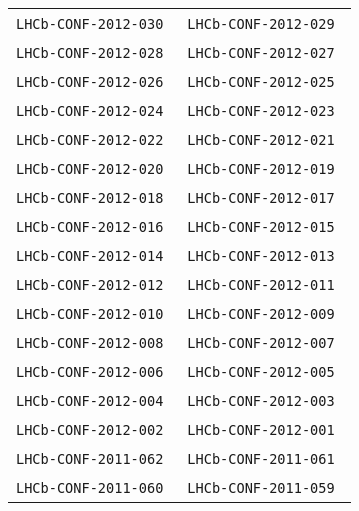 \begin{center}
\begin{longtable}{ll}
\texttt{LHCb-CONF-2012-030}~\cite{LHCb-CONF-2012-030} & 
\texttt{LHCb-CONF-2012-029}~\cite{LHCb-CONF-2012-029} \\
\texttt{LHCb-CONF-2012-028}~\cite{LHCb-CONF-2012-028} & 
\texttt{LHCb-CONF-2012-027}~\cite{LHCb-CONF-2012-027} \\
\texttt{LHCb-CONF-2012-026}~\cite{LHCb-CONF-2012-026} & 
\texttt{LHCb-CONF-2012-025}~\cite{LHCb-CONF-2012-025} \\
\texttt{LHCb-CONF-2012-024}~\cite{LHCb-CONF-2012-024} & 
\texttt{LHCb-CONF-2012-023}~\cite{LHCb-CONF-2012-023} \\
\texttt{LHCb-CONF-2012-022}~\cite{LHCb-CONF-2012-022} & 
\texttt{LHCb-CONF-2012-021}~\cite{LHCb-CONF-2012-021} \\
\texttt{LHCb-CONF-2012-020}~\cite{LHCb-CONF-2012-020} & 
\texttt{LHCb-CONF-2012-019}~\cite{LHCb-CONF-2012-019} \\
\texttt{LHCb-CONF-2012-018}~\cite{LHCb-CONF-2012-018} & 
\texttt{LHCb-CONF-2012-017}~\cite{LHCb-CONF-2012-017} \\
\texttt{LHCb-CONF-2012-016}~\cite{LHCb-CONF-2012-016} & 
\texttt{LHCb-CONF-2012-015}~\cite{LHCb-CONF-2012-015} \\
\texttt{LHCb-CONF-2012-014}~\cite{LHCb-CONF-2012-014} & 
\texttt{LHCb-CONF-2012-013}~\cite{LHCb-CONF-2012-013} \\
\texttt{LHCb-CONF-2012-012}~\cite{LHCb-CONF-2012-012} & 
\texttt{LHCb-CONF-2012-011}~\cite{LHCb-CONF-2012-011} \\
\texttt{LHCb-CONF-2012-010}~\cite{LHCb-CONF-2012-010} & 
\texttt{LHCb-CONF-2012-009}~\cite{LHCb-CONF-2012-009} \\
\texttt{LHCb-CONF-2012-008}~\cite{LHCb-CONF-2012-008} & 
\texttt{LHCb-CONF-2012-007}~\cite{LHCb-CONF-2012-007} \\
\texttt{LHCb-CONF-2012-006}~\cite{LHCb-CONF-2012-006} & 
\texttt{LHCb-CONF-2012-005}~\cite{LHCb-CONF-2012-005} \\
\texttt{LHCb-CONF-2012-004}~\cite{LHCb-CONF-2012-004} & 
\texttt{LHCb-CONF-2012-003}~\cite{LHCb-CONF-2012-003} \\
\texttt{LHCb-CONF-2012-002}~\cite{LHCb-CONF-2012-002} & 
\texttt{LHCb-CONF-2012-001}~\cite{LHCb-CONF-2012-001} \\
\hline
\texttt{LHCb-CONF-2011-062}~\cite{LHCb-CONF-2011-062} &
\texttt{LHCb-CONF-2011-061}~\cite{LHCb-CONF-2011-061} \\ 
\texttt{LHCb-CONF-2011-060}~\cite{LHCb-CONF-2011-060} &
\texttt{LHCb-CONF-2011-059}~\cite{LHCb-CONF-2011-059} \\

\end{longtable}
\end{center}
